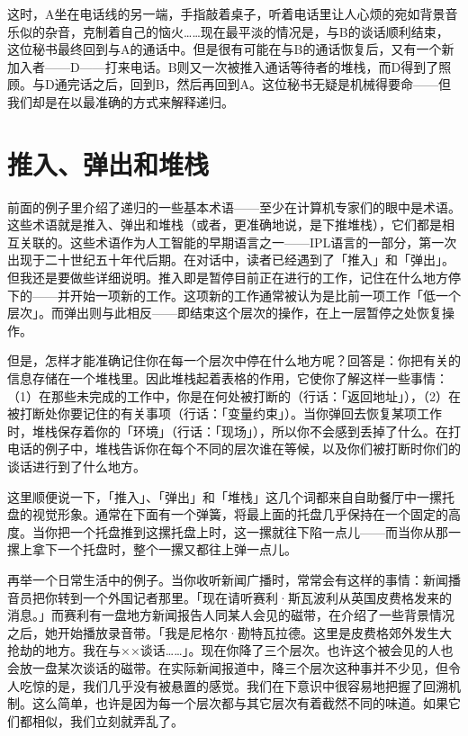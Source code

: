 \documentclass[
  12pt,
  twoside,
  openright,
  oldfontcommands,
]{memoir}
\begin{document}
这时，A坐在电话线的另一端，手指敲着桌子，听着电话里让人心烦的宛如背景音乐似的杂音，克制着自己的恼火\ldots\ldots 现在最平淡的情况是，与B的谈话顺利结束，这位秘书最终回到与A的通话中。但是很有可能在与B的通话恢复后，又有一个新加入者------D------打来电话。B则又一次被推入通话等待者的堆栈，而D得到了照顾。与D通完话之后，回到B，然后再回到A。这位秘书无疑是机械得要命------但我们却是在以最准确的方式来解释递归。

\section{推入、弹出和堆栈}

前面的例子里介绍了递归的一些基本术语------至少在计算机专家们的眼中是术语。这些术语就是推入、弹出和堆栈（或者，更准确地说，是下推堆栈），它们都是相互关联的。这些术语作为人工智能的早期语言之一------IPL语言的一部分，第一次出现于二十世纪五十年代后期。在对话中，读者已经遇到了「推入」和「弹出」。但我还是要做些详细说明。推入即是暂停目前正在进行的工作，记住在什么地方停下的------并开始一项新的工作。这项新的工作通常被认为是比前一项工作「低一个层次」。而弹出则与此相反------即结束这个层次的操作，在上一层暂停之处恢复操作。

但是，怎样才能准确记住你在每一个层次中停在什么地方呢？回答是：你把有关的信息存储在一个堆栈里。因此堆栈起着表格的作用，它使你了解这样一些事情：（1）在那些未完成的工作中，你是在何处被打断的（行话：「返回地址」），（2）在被打断处你要记住的有关事项（行话：「变量约束」）。当你弹回去恢复某项工作时，堆栈保存着你的「环境」（行话：「现场」），所以你不会感到丢掉了什么。在打电话的例子中，堆栈告诉你在每个不同的层次谁在等候，以及你们被打断时你们的谈话进行到了什么地方。

这里顺便说一下，「推入」、「弹出」和「堆栈」这几个词都来自自助餐厅中一摞托盘的视觉形象。通常在下面有一个弹簧，将最上面的托盘几乎保持在一个固定的高度。当你把一个托盘推到这摞托盘上时，这一摞就往下陷一点儿------而当你从那一摞上拿下一个托盘时，整个一摞又都往上弹一点儿。

再举一个日常生活中的例子。当你收听新闻广播时，常常会有这样的事情：新闻播音员把你转到一个外国记者那里。「现在请听赛利·斯瓦波利从英国皮费格发来的消息。」而赛利有一盘地方新闻报告人同某人会见的磁带，在介绍了一些背景情况之后，她开始播放录音带。「我是尼格尔·勘特瓦拉德。这里是皮费格郊外发生大抢劫的地方。我在与××谈话\ldots\ldots」。现在你降了三个层次。也许这个被会见的人也会放一盘某次谈话的磁带。在实际新闻报道中，降三个层次这种事并不少见，但令人吃惊的是，我们几乎没有被悬置的感觉。我们在下意识中很容易地把握了回溯机制。这么简单，也许是因为每一个层次都与其它层次有着截然不同的味道。如果它们都相似，我们立刻就弄乱了。
\end{document}

